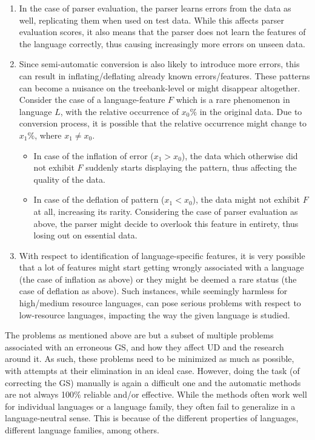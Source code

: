 \begin{enumerate}
    \item In the case of parser evaluation, the parser learns errors from the data as well, replicating them when used on test data. While this affects parser evaluation scores, it also means that the parser does not learn the features of the language correctly, thus causing increasingly more errors on unseen data.
    \item Since semi-automatic conversion is also likely to introduce more errors, this can result in inflating/deflating already known errors/features. These patterns can become a nuisance on the treebank-level or might disappear altogether. Consider the case of a language-feature \(F\) which is a rare phenomenon in language \(L\), with the relative occurrence of \(x_0 \%\) in the original data. Due to conversion process, it is possible that the relative occurrence might change to \(x_1 \%\), where \(x_1 \neq x_0\).
    \begin{itemize}
        \item In case of the inflation of error (\(x_1 > x_0\)), the data which otherwise did not exhibit \(F\) suddenly starts displaying the pattern, thus affecting the quality of the data.
        \item In case of the deflation of pattern (\(x_1 < x_0\)), the data might not exhibit \(F\) at all, increasing its rarity. Considering the case of parser evaluation as above, the parser might decide to overlook this feature in entirety, thus losing out on essential data.
    \end{itemize}
    \item With respect to identification of language-specific features, it is very possible that a lot of features might start getting wrongly associated with a language (the case of inflation as above) or they might be deemed a rare status (the case of deflation as above). Such instances, while seemingly harmless for high/medium resource languages, can pose serious problems with respect to low-resource languages, impacting the way the given language is studied.
\end{enumerate}

The problems as mentioned above are but a subset of multiple problems associated with an erroneous GS, and how they affect UD and the research around it. As such, these problems need to be minimized as much as possible, with attempts at their elimination in an ideal case. However, doing the task (of correcting the GS) manually is again a difficult one and the automatic methods are not always 100\% reliable and/or effective. While the methods often work well for individual languages or a language family, they often fail to generalize in a language-neutral sense. This is because of the different properties of languages, different language families, among others.

